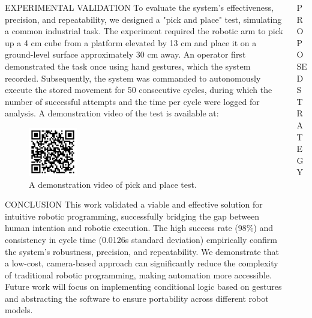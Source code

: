 \documentclass[%
  final,%
  english,%
  english,%
]{beamer}
\begin{document}
\begin{frame}[t, fragile = singleslide]
\begin{columns}[t, onlytextwidth]
\begin{column}{0.49\textwidth}


\begin{block}{EXPERIMENTAL VALIDATION}
To evaluate the system's effectiveness, precision, and repeatability, we designed a "pick and place" test, simulating a common industrial task. The experiment required the robotic arm to pick up a 4 cm cube from a platform elevated by 13 cm and place it on a ground-level surface approximately 30 cm away. An operator first demonstrated the task once using hand gestures, which the system recorded. Subsequently, the system was commanded to autonomously execute the stored movement for 50 consecutive cycles, during which the number of successful attempts and the time per cycle were logged for analysis. A demonstration video of the test is available at:

\begin{figure}[htbp]
    \centering
    \includegraphics[width=.2\columnwidth]{Figuras/QR_Code.png} 
    \caption{A demonstration video of pick and place test.}
    \label{fig:qrcode}
\end{figure}

\end{block}

\begin{block}{CONCLUSION}
This work validated a viable and effective solution for intuitive robotic programming, successfully bridging the gap between human intention and robotic execution. The high success rate (98\%) and consistency in cycle time (0.0126s standard deviation) empirically confirm the system's robustness, precision, and repeatability. We demonstrate that a low-cost, camera-based approach can significantly reduce the complexity of traditional robotic programming, making automation more accessible. Future work will focus on implementing conditional logic based on gestures and abstracting the software to ensure portability across different robot models.

\end{block}

%
%
%
%
\end{column}
%
\begin{column}{.49\textwidth}
% 
\begin{block}{PROPOSED STRATEGY}


\end{block}
\end{column}
\end{columns}
\end{frame}
\end{document}
